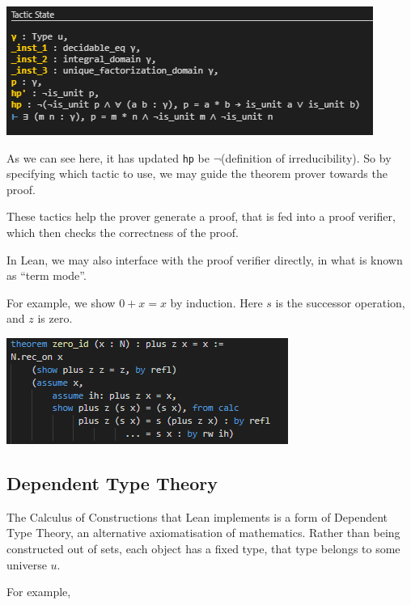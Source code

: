 \documentclass[pagesize=a4]{scrreprt}
\begin{document}
\smallskip
\begin{center}

\includegraphics{tactic_state.png}

\end{center}
As we can see here, it has updated \texttt{hp} be $\neg$(definition of irreducibility). So by specifying which tactic to use, we may guide the theorem prover towards the proof. 

These tactics help the prover generate a proof, that is fed into a proof verifier, which then checks the correctness of the proof. 

In Lean, we may also interface with the proof verifier directly, in what is known as ``term mode''. 

For example, we show $0 + x = x$ by induction. Here $s$ is the successor operation, and $z$ is zero. 


\smallskip

\begin{center}

\includegraphics{term_example.png}

\end{center}

\subsection{Dependent Type Theory}

The Calculus of Constructions that Lean implements is a form of Dependent Type Theory, an alternative axiomatisation of mathematics. Rather than being constructed out of sets, each object has a fixed type, that type belongs to some universe $u$. 

For example, 
\end{document}
